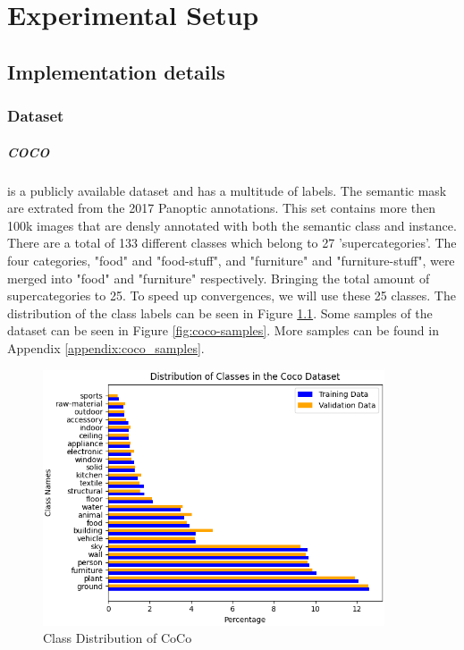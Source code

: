 \chapter{Experimental Setup}\label{chapter:second_real_chapter}

\section{Implementation details}
\subsection{Dataset}
\paragraph{COCO\cite{lin2015microsoftcococommonobjects}} is a publicly available dataset and has a multitude of labels. The semantic mask are extrated from the 2017 Panoptic annotations. This set contains more then 100k images that are densly annotated with both the semantic class and instance. There are a total of 133 different classes which belong to 27 'supercategories'. The four categories, "food" and "food-stuff", and "furniture" and "furniture-stuff", were merged into "food" and "furniture" respectively. Bringing the total amount of supercategories to 25. To speed up convergences, we will use these 25 classes. The distribution of the class labels can be seen in Figure \ref{fig:coco-class-distribution}. Some samples of the dataset can be seen in Figure \ref{fig:coco-samples}. More samples can be found in Appendix \ref{appendix:coco_samples}. 

\begin{figure}[h]
    \centering
    \includegraphics[width=0.9\textwidth]{figures/datasets/coco/class_distribution.png}
    \caption{Class Distribution of CoCo}
    \label{fig:coco-class-distribution}
\end{figure}

